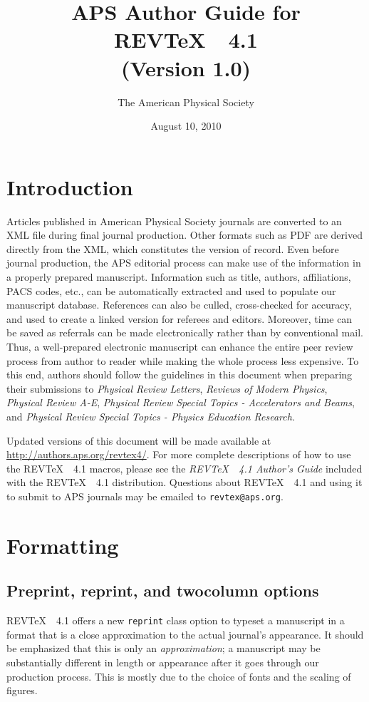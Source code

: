 \documentclass[twocolumn,secnumarabic,amssymb, nobibnotes, aps, prd]{revtex4-1}
\newcommand{\revtex}{REV\TeX\ }
\newcommand{\classoption}[1]{\texttt{#1}}
\begin{document}
\title{APS Author Guide for \revtex~4.1\\(Version 1.0)}%

\author{The American Physical Society}%
\date{August 10, 2010}%
\maketitle
\tableofcontents

\section{Introduction}
Articles published in American Physical Society journals are converted to 
an XML file during final journal production. Other formats such
as PDF are derived directly from the XML, which constitutes the version of record. 
Even before journal production, the APS editorial process can make use
of the information in a properly prepared manuscript. Information such
as title, authors, affiliations, PACS codes, etc., can be automatically
extracted and used to populate our manuscript database. References can
also be culled, cross-checked for accuracy, and used to create a
linked version for referees and editors. Moreover, time can be saved
as referrals can be made electronically rather than by conventional
mail. Thus, a well-prepared electronic manuscript can enhance the
entire peer review process from author to reader while making the
whole process less expensive. To this end, authors should follow the
guidelines in this document when preparing their submissions to \textit{Physical Review Letters},
 \textit{Reviews of Modern Physics},  \textit{Physical Review A-E},  \textit{Physical Review Special Topics - Accelerators and Beams}, and  \textit{Physical Review Special Topics - Physics Education Research}.
 
Updated versions of this document will be made available at  \url{http://authors.aps.org/revtex4/}. For more complete
descriptions of how to use the \revtex\ 4.1 macros, please see the
\textit{\revtex~4.1 Author's Guide} included with the \revtex~4.1
distribution. Questions about \revtex\ 4.1 and using it to submit to APS journals may be
emailed to \texttt{revtex@aps.org}.

\section{Formatting}
\subsection{Preprint, reprint, and twocolumn options}
\revtex~4.1 offers a new \classoption{reprint} class option to typeset a manuscript
in a format that is a close approximation to the actual journal's appearance. It should
be emphasized that this is only an \textit{approximation}; a manuscript may be substantially different
in length or appearance after it goes through our production process. This is mostly due to the choice
of fonts and the scaling of figures.
\end{document}

